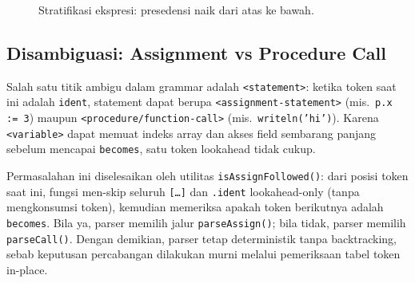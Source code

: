\documentclass[11pt,a4paper]{article}
\begin{document}
\begin{figure}[H]
\centering
{}
\caption{Stratifikasi ekspresi: presedensi naik dari atas ke bawah.}
\label{fig:expr-strat}
\end{figure}

\subsection{Disambiguasi: Assignment vs Procedure Call}

Salah satu titik ambigu dalam grammar adalah \texttt{<statement>}: ketika
token saat ini adalah \texttt{ident}, statement dapat berupa
\texttt{<assignment-statement>} (mis.\ \texttt{p.x := 3}) maupun
\texttt{<procedure/function-call>} (mis.\ \texttt{writeln('hi')}).
Karena \texttt{<variable>} dapat memuat indeks array dan akses field
sembarang panjang sebelum mencapai \texttt{becomes}, satu token lookahead
tidak cukup.

Permasalahan ini diselesaikan oleh utilitas \texttt{isAssignFollowed()}: dari
posisi token saat ini, fungsi men-skip seluruh \texttt{[\dots]} dan
\texttt{.ident} lookahead-only (tanpa mengkonsumsi token), kemudian memeriksa
apakah token berikutnya adalah \texttt{becomes}. Bila ya, parser memilih jalur
\texttt{parseAssign()}; bila tidak, parser memilih \texttt{parseCall()}.
Dengan demikian, parser tetap deterministik tanpa backtracking, sebab keputusan
percabangan dilakukan murni melalui pemeriksaan tabel token in-place.
\end{document}
